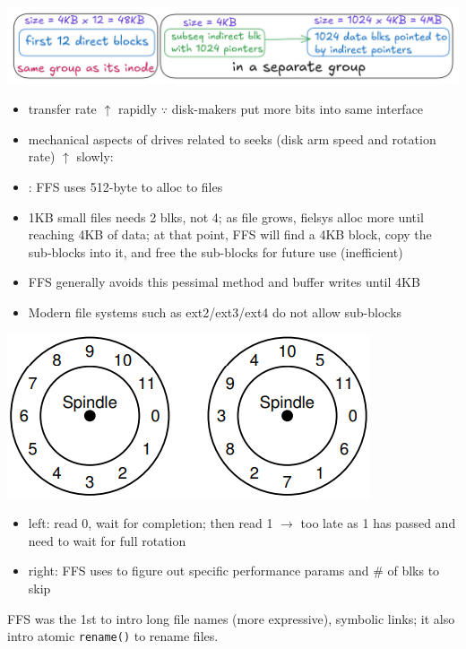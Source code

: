 \includegraphics[width=\linewidth]{imgs/ffs_large_file_real}
\begin{itemize}
\item transfer rate $\uparrow$ rapidly $\because$ disk-makers put more bits into same interface
\item mechanical aspects of drives related to seeks (disk arm speed and rotation rate) $\uparrow$ slowly:
\item {}: FFS uses 512-byte  to alloc to files
\item 1KB small files needs 2 blks, not 4; as file grows, fielsys alloc more until reaching 4KB of data; at that point, FFS will find a 4KB block, copy the sub-blocks into it, and free the sub-blocks for future use (inefficient)
\item FFS generally avoids this pessimal method and buffer writes until 4KB
\item Modern file systems such as ext2/ext3/ext4 do not allow sub-blocks
\end{itemize}
\begin{minipage}{.45\linewidth}
  \includegraphics[width=\linewidth]{imgs/ffs_disk_layout}
\end{minipage}
\begin{minipage}{.55\linewidth}
  \flushleft
  \begin{itemize}
  \item left: read 0, wait for completion; then read 1 $\to$ too late as 1 has passed and need to wait for full rotation
  \item right: FFS uses  to figure out specific performance params and \# of blks to skip
  \end{itemize}
\end{minipage}
\begin{tcolorbox}[left=0mm, top=1mm, right=0mm, rightlower=0mm, bottom=1mm,
  title= Make System Usable,
  halign title=center]
  FFS was the 1st to intro long file names (more expressive), symbolic links; it also intro atomic \texttt{rename()} to rename files.
\end{tcolorbox}
